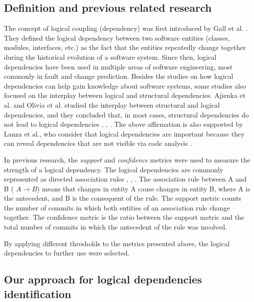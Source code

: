 \documentclass[runningheads]{comsis2}
\begin{document}
\subsection{Definition and previous related research}
\label{definition_ld}
The concept of logical coupling (dependency) was first introduced by Gall et al. \cite{Gall:1998:DLC:850947.853338}. They defined the logical dependency between two software entities (classes, modules, interfaces, etc.) as the fact that the entities repeatedly change together during the historical evolution of a software system.
Since then, logical dependencies have been used in multiple areas of software engineering, most commonly in fault and change prediction.  
Besides the studies on how logical dependencies can help gain knowledge about software systems, some studies also focused on the interplay between logical and structural dependencies. Ajienka et al. and Olivia et al. studied the interplay between structural and logical dependencies, and they concluded that, in most cases, structural dependencies do not lead to logical dependencies \cite{Oliva:2011:ISL:2067853.2068086}, \cite{DBLP:conf/issre/OlivaG15}, \cite{DBLP:journals/jss/AjienkaC17}. The above affirmation is also supported by Lanza et al., who consider that logical dependencies are important because they can reveal dependencies that are not visible via code analysis \cite{inproceedings_radar_evolution}.



In previous research, the \textit{support} and \textit{confidence} metrics were used to measure the strength of a logical dependency. 
The logical dependencies are commonly represented as directed association rules \cite{DBLP:conf/issre/OlivaG15}, \cite{DBLP:journals/jss/AjienkaC17}, \cite{Zimmermann:2004:MVH:998675.999460}. The association rule between A and B ( $A \rightarrow B$) means that changes in entity A cause changes in entity B, where A is the antecedent, and B is the consequent of the rule. 
The support metric counts the number of commits in which both entities of an association rule change together. The confidence metric is the ratio between the support metric and the total number of commits in which the antecedent of the rule was involved. 

By applying different thresholds to the metrics presented above, the logical dependencies to further use were selected.


\subsection{Our approach for logical dependencies identification}
\label{current_approach}
\end{document}
